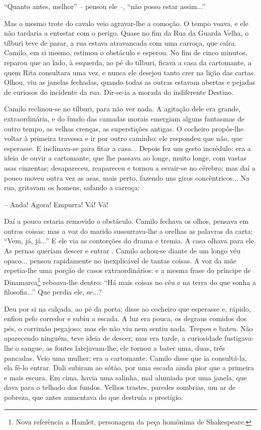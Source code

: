 ``Quanto antes, melhor'' -- pensou ele --, ``não posso estar assim...''

Mas o mesmo trote do cavalo veio agravar-lhe a comoção. O tempo voava, e
ele não tardaria a entestar com o perigo. Quase no fim da Rua da Guarda
Velha, o tílburi teve de parar, a rua estava atravancada com uma
carroça, que caíra. Camilo, em si mesmo, estimou o obstáculo e esperou.
No fim de cinco minutos, reparou que ao lado, à esquerda, ao pé do
tílburi, ficava a casa da cartomante, a quem Rita consultara uma vez, e
nunca ele desejou tanto crer na lição das cartas. Olhou, viu as janelas
fechadas, quando todas as outras estavam abertas e pejadas de curiosos
do incidente da rua. Dir-se-ia a morada do indiferente Destino.

Camilo reclinou-se no tílburi, para não ver nada. A agitação dele era
grande, extraordinária, e do fundo das camadas morais emergiam alguns
fantasmas de outro tempo, as velhas crenças, as superstições antigas. O
cocheiro propôs-lhe voltar à primeira travessa e ir por outro caminho:
ele respondeu que não, que esperasse. E inclinava-se para fitar a
casa... Depois fez um gesto incrédulo: era a ideia de ouvir a
cartomante, que lhe passava ao longe, muito longe, com vastas asas
cinzentas; desapareceu, reapareceu e tornou a esvair-se no cérebro; mas
daí a pouco moveu outra vez as asas, mais perto, fazendo uns giros
concêntricos... Na rua, gritavam os homens, safando a carroça:

-- Anda! Agora! Empurra! Vá! Vá!

Daí a pouco estaria removido o obstáculo. Camilo fechava os olhos,
pensava em outras coisas: mas a voz do marido sussurrava-lhe a orelhas
as palavras da carta: ``Vem, já, já...'' E ele via as contorções do
drama e tremia. A casa olhava para ele. As pernas queriam descer e
entrar . Camilo achou-se diante de um longo véu opaco... pensou
rapidamente no inexplicável de tantas coisas. A voz da mãe repetia-lhe
uma porção de casos extraordinários: e a mesma frase do príncipe de
Dinamarca\footnote{Nova referência a Hamlet, personagem da peça homônima
  de Shakespeare.} reboava-lhe dentro: ``Há mais coisas no céu e na
terra do que sonha a filosofia...'' Que perdia ele, se...?

Deu por si na calçada, ao pé da porta: disse ao cocheiro que esperasse
e, rápido, enfiou pelo corredor e subiu a escada. A luz era pouca, os
degraus comidos dos pés, o corrimão pegajoso; mas ele não viu nem sentiu
nada. Trepou e bateu. Não aparecendo ninguém, teve ideia de descer; mas
era tarde, a curiosidade fustigava-lhe o sangue, as fontes
latejavam-lhe; ele tornou a bater uma, duas, três pancadas. Veio uma
mulher; era a cartomante. Camilo disse que ia consultá-la, ela fê-lo
entrar. Dali subiram ao sótão, por uma escada ainda pior que a primeira
e mais escura. Em cima, havia uma salinha, mal alumiada por uma janela,
que dava para o telhado dos fundos. Velhos trastes, paredes sombrias, um
ar de pobreza, que antes aumentava do que destruía o prestígio.

